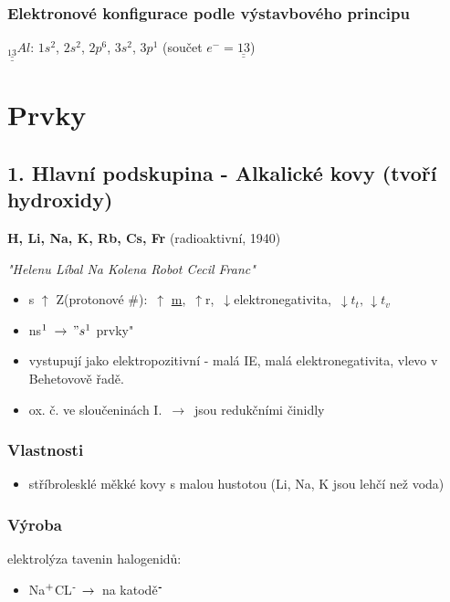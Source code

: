 \documentclass{article}
\def\SP#1{\textsuperscript{#1}}
\begin{document}
    \subsubsection{Elektronové konfigurace podle výstavbového principu}
    $\underline{\underline{_{13}}}Al$: $1s^2$, $2s^2$, $2p^6$, $3s^2$, $3p^1$ (součet $e^- = \underline{\underline{13}}$)
\newpage
\TabPositions{0em, 20em}
\section{Prvky}
\subsection{1. Hlavní podskupina - Alkalické kovy (tvoří hydroxidy)}
\textbf{H, Li, Na, K, Rb, Cs, Fr} (radioaktivní, 1940)

\textit{"Helenu Líbal Na Kolena Robot Cecil Franc"}
    \begin{itemize}
        \item s $\uparrow$ Z(protonové \#): $\, \uparrow$ \underline{m}, $\, \uparrow$r, $\, \downarrow$elektronegativita, $\, \downarrow t_t, \, \downarrow t_v$
        \item ns$\SP{1}$ \fbox{$\downarrow$} $\,\to\, "s\SP{1}$ prvky"
        
        \item vystupují jako elektropozitivní - malá IE, malá elektronegativita, vlevo v Behetovově řadě.
        \item ox. č. ve sloučeninách I. $\,\to\,$ jsou redukčními činidly
    \end{itemize}
    \subsubsection{Vlastnosti}
        \begin{itemize}
            \item stříbrolesklé měkké kovy s malou hustotou (Li, Na, K jsou lehčí než voda)
        \end{itemize}
    \subsubsection{Výroba}
        elektrolýza tavenin halogenidů:
        \begin{itemize}
            \item Na$\SP{+}$CL$\SP{-}\,\to\,$ na katodě$\SP{\textbf{-}}$
        \end{itemize}
\end{document}
